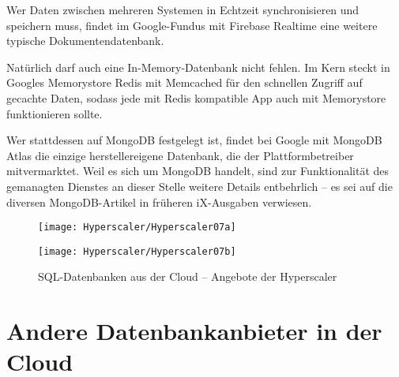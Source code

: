Wer Daten zwischen mehreren Systemen in Echtzeit synchronisieren und speichern muss, findet im Google-Fundus mit Firebase Realtime eine weitere typische Dokumentendatenbank.

Natürlich darf auch eine In-Memory-Datenbank nicht fehlen. Im Kern steckt in Googles Memorystore Redis mit Memcached für den schnellen Zugriff auf gecachte Daten, sodass jede mit Redis kompatible App auch mit Memorystore funktionieren sollte.

Wer stattdessen auf MongoDB festgelegt ist, findet bei Google mit MongoDB Atlas die einzige herstellereigene Datenbank, die der Plattformbetreiber mitvermarktet. Weil es sich um MongoDB handelt, sind zur Funktionalität des gemanagten Dienstes an dieser Stelle weitere Details entbehrlich – es sei auf die diversen MongoDB-Artikel in früheren iX-Ausgaben verwiesen.

\begin{figure}
	
	\begin{center}
		
		\texttt{[image: Hyperscaler/Hyperscaler07a]}
		
		\texttt{[image: Hyperscaler/Hyperscaler07b]}
		
		\caption{SQL-Datenbanken aus der Cloud -- Angebote der Hyperscaler}
	\end{center} 
\end{figure}

%

\section{Andere Datenbankanbieter in der Cloud}

